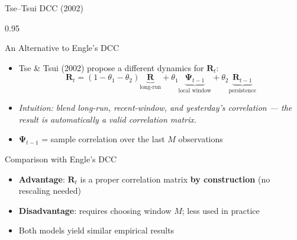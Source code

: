 \documentclass[9pt, aspectratio=169, t]{beamer}
\begin{document}
\begin{frame}{Tse--Tsui DCC (2002)}
    \begin{cminipage}{0.95\textwidth}
    {\footnotesize
    \begin{block}{An Alternative to Engle's DCC}
        \begin{itemize}\setlength{\itemsep}{0pt}
            \item Tse \& Tsui (2002) propose a different dynamics for $\mathbf{R}_t$:
            \[
                \mathbf{R}_t = (1 - \theta_1 - \theta_2)\underbrace{\mathbf{R}}_{\text{long-run}} + \theta_1 \underbrace{\boldsymbol{\Psi}_{t-1}}_{\text{local window}} + \theta_2 \underbrace{\mathbf{R}_{t-1}}_{\text{persistence}}
            \]
            \item \textit{Intuition: blend long-run, recent-window, and yesterday's correlation --- the result is automatically a valid correlation matrix.}
            \item $\boldsymbol{\Psi}_{t-1}$ = sample correlation over the last $M$ observations
        \end{itemize}
    \end{block}
    \begin{block}{Comparison with Engle's DCC}
        \begin{itemize}\setlength{\itemsep}{0pt}
            \item \textbf{Advantage}: $\mathbf{R}_t$ is a proper correlation matrix \textbf{by construction} (no rescaling needed)
            \item \textbf{Disadvantage}: requires choosing window $M$; less used in practice
            \item Both models yield similar empirical results
        \end{itemize}
    \end{block}
    }
    \end{cminipage}
\end{frame}
\end{document}
